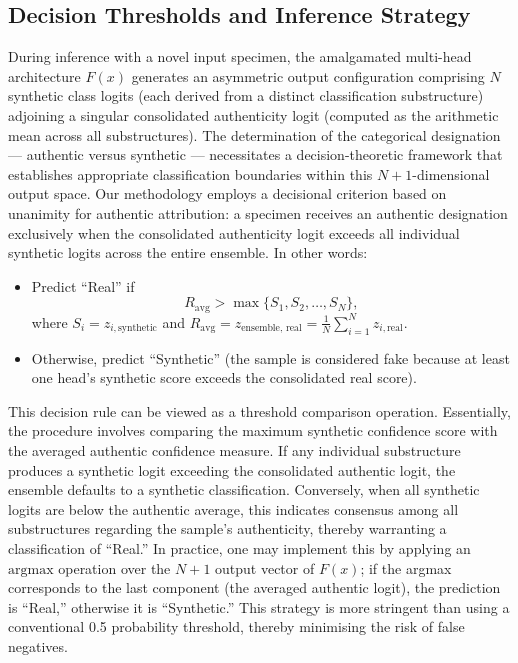 \documentclass[conference]{IEEEtran}  %
\begin{document}
\subsection{Decision Thresholds and Inference Strategy}
During inference with a novel input specimen, the amalgamated multi-head architecture \(F(x)\) generates an asymmetric output configuration comprising \(N\) synthetic class logits (each derived from a distinct classification substructure) adjoining a singular consolidated authenticity logit (computed as the arithmetic mean across all substructures). The determination of the categorical designation --- authentic versus synthetic --- necessitates a decision-theoretic framework that establishes appropriate classification boundaries within this \(N+1\)-dimensional output space. Our methodology employs a decisional criterion based on unanimity for authentic attribution: a specimen receives an authentic designation exclusively when the consolidated authenticity logit exceeds all individual synthetic logits across the entire ensemble. In other words:
\begin{itemize}
    \item Predict ``Real'' if 
    \begin{equation}
    \label{eq:decision_rule1}
    R_{\text{avg}} > \max\{S_1, S_2, \dots, S_N\},
    \end{equation}
    where \(S_i = z_{i,\text{synthetic}}\) and \(R_{\text{avg}} = z_{\text{ensemble, real}} = \frac{1}{N}\sum_{i=1}^{N} z_{i,\text{real}}\).
    \item Otherwise, predict ``Synthetic'' (the sample is considered fake because at least one head’s synthetic score exceeds the consolidated real score).
\end{itemize}

This decision rule can be viewed as a threshold comparison operation. Essentially, the procedure involves comparing the maximum synthetic confidence score with the averaged authentic confidence measure. If any individual substructure produces a synthetic logit exceeding the consolidated authentic logit, the ensemble defaults to a synthetic classification. Conversely, when all synthetic logits are below the authentic average, this indicates consensus among all substructures regarding the sample's authenticity, thereby warranting a classification of ``Real.'' In practice, one may implement this by applying an \(\mathrm{argmax}\) operation over the \(N+1\) output vector of \(F(x)\); if the argmax corresponds to the last component (the averaged authentic logit), the prediction is ``Real,'' otherwise it is ``Synthetic.'' This strategy is more stringent than using a conventional 0.5 probability threshold, thereby minimising the risk of false negatives.
\end{document}
